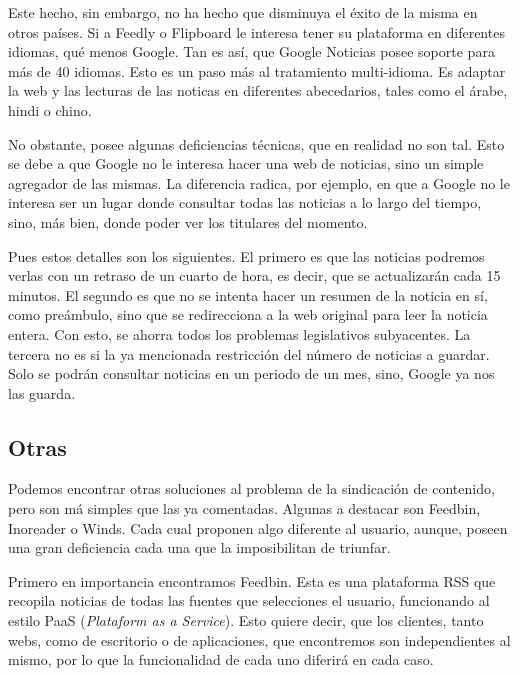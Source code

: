 Este hecho, sin embargo, no ha hecho que disminuya el éxito de la misma en otros países. Si a Feedly o Flipboard le interesa tener su plataforma en diferentes idiomas, qué menos Google. Tan es así, que Google Noticias posee soporte para más de 40 idiomas. Esto es un paso más al tratamiento multi-idioma. Es adaptar la web y las lecturas de las noticas en diferentes abecedarios, tales como el árabe, hindi o chino.

No obstante, posee algunas deficiencias técnicas, que en realidad no son tal. Esto se debe a que Google no le interesa hacer una web de noticias, sino un simple agregador de las mismas. La diferencia radica, por ejemplo, en que a Google no le interesa ser un lugar donde consultar todas las noticias a lo largo del tiempo, sino, más bien, donde poder ver los titulares del momento.


Pues estos detalles son los siguientes. El primero es que las noticias podremos verlas con un retraso de un cuarto de hora, es decir, que se actualizarán cada 15 minutos. El segundo es que no se intenta hacer un resumen de la noticia en sí, como preámbulo, sino que se redirecciona a la web original para leer la noticia entera. Con esto, se ahorra todos los problemas legislativos subyacentes. La tercera no es si la ya mencionada restricción del número de noticias a guardar. Solo se podrán consultar noticias en un periodo de un mes, sino, Google ya nos las guarda.

\subsection{Otras}

Podemos encontrar otras soluciones al problema de la sindicación de contenido, pero son má simples que las ya comentadas. Algunas a destacar son Feedbin, Inoreader o Winds. Cada cual proponen algo diferente al usuario, aunque, poseen una gran deficiencia cada una que la imposibilitan de triunfar.

Primero en importancia encontramos Feedbin. Esta es una plataforma RSS que recopila noticias de todas las fuentes que selecciones el usuario, funcionando al estilo PaaS (\textit{Plataform as a Service}). Esto quiere decir, que los clientes, tanto webs, como de escritorio o de aplicaciones, que encontremos son independientes al mismo, por lo que la funcionalidad de cada uno diferirá en cada caso.

